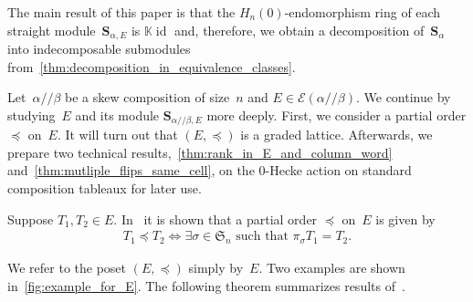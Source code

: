 \documentclass[ALCO,ThmDefs,Unicode,epreuves]{cedram}
\newcommand{\bs}[1]{\boldsymbol{#1} }
\newcommand{\mc}[1]{\mathcal{#1} }
\newcommand{\K}{\mathbb K}
\DeclareMathOperator{\id}{id}
\newcommand{\fS}{\mathfrak{S}}
\newcommand{\He}{H_n(0)}
\newcommand{\ab}{{\alpha / \! \! / \beta}}
\newcommand{\pleq}{\preceq}
\newcommand{\sa}{\bs S_{\alpha}}
\newcommand{\se}{\bs S_{\alpha,E}}
\newcommand{\sse}{\bs S_{\ab,E}}
\begin{document}
The main result of this paper is that the $\He$-endomorphism ring of each straight module~$\se$ is $\K \id$ and, therefore, we obtain a decomposition of~$\sa$ into indecomposable submodules from~\cref{thm:decomposition_in_equivalence_classes}.


Let~$\ab$ be a skew composition of size~$n$ and $E\in \mc E(\ab)$.
 We continue by studying~$E$ and its module $\sse$ more deeply.
First, we consider a partial order $\pleq$ on~$E$.
It will turn out that $(E,\pleq)$ is a graded lattice.
Afterwards, we prepare two technical results,~\cref{thm:rank_in_E_and_column_word} and~\cref{thm:mutliple_flips_same_cell}, on the 0-Hecke action on standard composition tableaux for later use. 

Suppose $T_1,T_2\in E$. In~\cite[Section~4]{Tewari2015} it is shown that a partial order $\pleq$ on~$E$ is given by
\begin{align*}
	T_1 \pleq T_2 \iff \exists \sigma \in \fS_n \text{ such that } \pi_\sigma T_1 = T_2.
\end{align*}

 We refer to the poset $(E,\pleq)$ simply by~$E$. Two examples are shown in~\cref{fig:example_for_E}. The following theorem summarizes results of~\cite[Section~6]{Tewari2015}.
\end{document}
